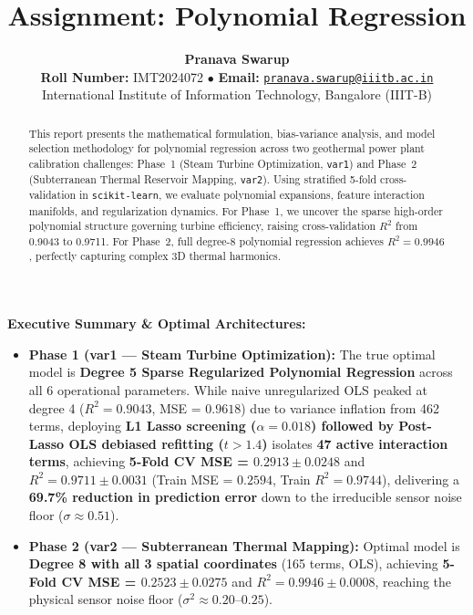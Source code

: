 \documentclass[11pt,a4paper]{article}
\title{\vspace{-1.2cm}\textbf{\LARGE\color{primary} Assignment: Polynomial Regression}}
\author{
    \textbf{\large Pranava Swarup} \\[0.2em]
    \textbf{Roll Number:} IMT2024072 \quad $\bullet$ \quad 
    \textbf{Email:} \href{mailto:pranava.swarup@iiitb.ac.in}{\texttt{pranava.swarup@iiitb.ac.in}} \\[0.2em]
    \small International Institute of Information Technology, Bangalore (IIIT-B)
}
\date{}
\begin{document}
\maketitle
\vspace{-0.8cm}

\begin{tcolorbox}[colback=cardbg,colframe=secondary,arc=2mm,boxrule=1pt,left=6pt,right=6pt,top=5pt,bottom=5pt]
\textbf{\color{primary} Executive Summary \& Optimal Architectures:}
\begin{itemize}\setlength\itemsep{0.15em}
    \item \textbf{Phase 1 (var1 --- Steam Turbine Optimization):} The true optimal model is \textbf{\color{primary} Degree 5 Sparse Regularized Polynomial Regression} across all 6 operational parameters. While naive unregularized OLS peaked at degree 4 ($R^2 = 0.9043$, MSE = $0.9618$) due to variance inflation from 462 terms, deploying \textbf{L1 Lasso screening ($\alpha = 0.018$) followed by Post-Lasso OLS debiased refitting ($t > 1.4$)} isolates \textbf{47 active interaction terms}, achieving \textbf{5-Fold CV MSE = $0.2913 \pm 0.0248$} and \textbf{$R^2 = 0.9711 \pm 0.0031$} (Train MSE = $0.2594$, Train $R^2 = 0.9744$), delivering a \textbf{69.7\% reduction in prediction error} down to the irreducible sensor noise floor ($\sigma \approx 0.51$).
    \item \textbf{Phase 2 (var2 --- Subterranean Thermal Mapping):} Optimal model is \textbf{\color{primary} Degree 8 with all 3 spatial coordinates} (165 terms, OLS), achieving \textbf{5-Fold CV MSE = $0.2523 \pm 0.0275$} and \textbf{$R^2 = 0.9946 \pm 0.0008$}, reaching the physical sensor noise floor ($\sigma^2 \approx 0.20$--$0.25$).
\end{itemize}
\end{tcolorbox}

\begin{abstract}
This report presents the mathematical formulation, bias-variance analysis, and model selection methodology for polynomial regression across two geothermal power plant calibration challenges: Phase~1 (Steam Turbine Optimization, \texttt{var1}) and Phase~2 (Subterranean Thermal Reservoir Mapping, \texttt{var2}). Using stratified 5-fold cross-validation in \texttt{scikit-learn}, we evaluate polynomial expansions, feature interaction manifolds, and regularization dynamics. For Phase~1, we uncover the sparse high-order polynomial structure governing turbine efficiency, raising cross-validation $R^2$ from 0.9043 to 0.9711. For Phase~2, full degree-8 polynomial regression achieves $R^2 = 0.9946$, perfectly capturing complex 3D thermal harmonics.
\end{abstract}
\end{document}
